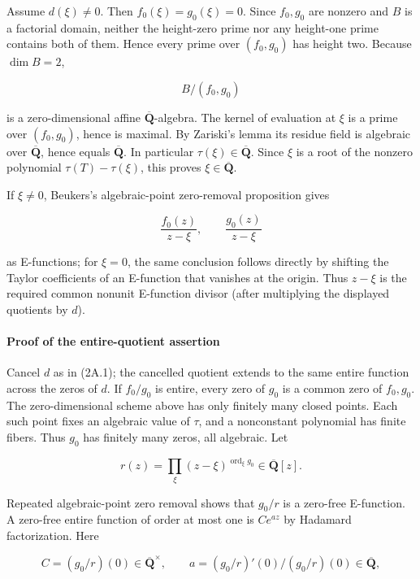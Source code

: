 Assume \(d(\xi)\ne0\). Then \(f_0(\xi)=g_0(\xi)=0\). Since \(f_0,g_0\)
are nonzero and \(B\) is a factorial domain, neither the height-zero prime nor
any height-one prime contains both of them. Hence every prime over
\((f_0,g_0)\) has height two. Because \(\dim B=2\),

\[
  B/(f_0,g_0)
\]

is a zero-dimensional affine \(\overline{\mathbf Q}\)-algebra. The kernel
of evaluation at \(\xi\) is a prime over \((f_0,g_0)\), hence is maximal.
By Zariski's lemma its residue field is algebraic over
\(\overline{\mathbf Q}\), hence equals \(\overline{\mathbf Q}\). In particular
\(\tau(\xi)\in\overline{\mathbf Q}\). Since \(\xi\) is a root of the
nonzero polynomial \(\tau(T)-\tau(\xi)\), this proves
\(\xi\in\overline{\mathbf Q}\).

If \(\xi\ne0\), Beukers's algebraic-point zero-removal proposition gives

\[
  \frac{f_0(z)}{z-\xi},\qquad
  \frac{g_0(z)}{z-\xi}
\]

as E-functions; for \(\xi=0\), the same conclusion follows directly by
shifting the Taylor coefficients of an E-function that vanishes at the
origin. Thus \(z-\xi\) is the required common nonunit E-function
divisor (after multiplying the displayed quotients by \(d\)).

\paragraph{Proof of the entire-quotient assertion}

Cancel \(d\) as in (2A.1); the cancelled quotient extends to the same entire
function across the zeros of \(d\). If \(f_0/g_0\) is entire, every zero of \(g_0\)
is a common zero of \(f_0,g_0\). The zero-dimensional scheme above has only
finitely many closed points. Each such point fixes an algebraic value of
\(\tau\), and a nonconstant polynomial has finite fibers. Thus \(g_0\) has
finitely many zeros, all algebraic. Let

\[
  r(z)=\prod_\xi(z-\xi)^{\operatorname{ord}_\xi g_0}
  \in\overline{\mathbf Q}[z].                               \tag{J-2A.2}
\]

Repeated algebraic-point zero removal shows that \(g_0/r\) is a zero-free
E-function. A zero-free entire function of order at most one is
\(Ce^{az}\) by Hadamard factorization. Here

\[
  C=(g_0/r)(0)\in\overline{\mathbf Q}^{\times},\qquad
  a=(g_0/r)'(0)/(g_0/r)(0)\in\overline{\mathbf Q},
\]

